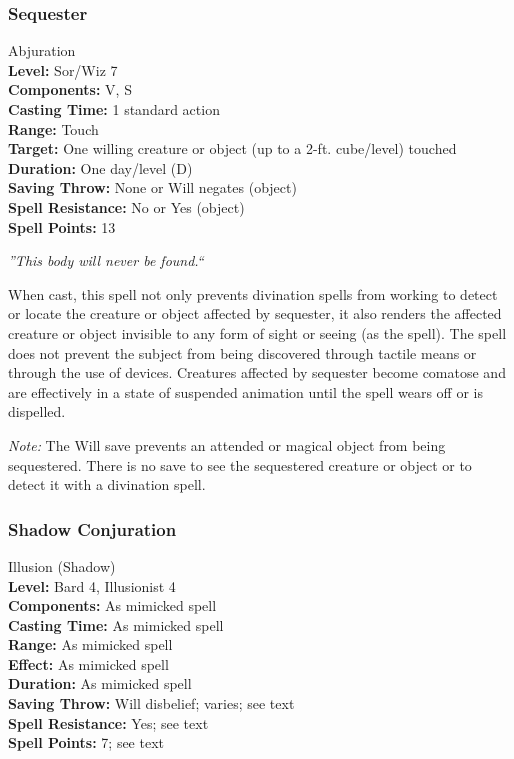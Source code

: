 \subsubsection{Sequester}
\label{Spell:Sequester}
Abjuration
\\ \textbf{Level:} Sor/Wiz 7
\\ \textbf{Components:} V, S
\\ \textbf{Casting Time:} 1 standard action
\\ \textbf{Range:} Touch
\\ \textbf{Target:} One willing creature or object (up to a 2-ft. cube/level) touched
\\ \textbf{Duration:} One day/level (D)
\\ \textbf{Saving Throw:} None or Will negates (object)
\\ \textbf{Spell Resistance:} No or Yes (object)
\\ \textbf{Spell Points:} 13

\emph{''This body will never be found.``}

When cast, this spell not only prevents divination spells from working to detect or locate the creature or object affected by sequester, 
it also renders the affected creature or object invisible to any form of sight or seeing (as the  spell). 
The spell does not prevent the subject from being discovered through tactile means or through the use of devices. 
Creatures affected by sequester become comatose and are effectively in a state of suspended animation until the spell wears off or is dispelled.

\emph{Note:} The Will save prevents an attended or magical object from being sequestered. 
There is no save to see the sequestered creature or object or to detect it with a divination spell. 
\subsubsection{Shadow Conjuration}
\label{Spell:ShadowConjuration}
Illusion (Shadow)
\\ \textbf{Level:} Bard 4, Illusionist 4
\\ \textbf{Components:} As mimicked spell
\\ \textbf{Casting Time:} As mimicked spell
\\ \textbf{Range:} As mimicked spell
\\ \textbf{Effect:} As mimicked spell
\\ \textbf{Duration:} As mimicked spell
\\ \textbf{Saving Throw:} Will disbelief; varies; see text
\\ \textbf{Spell Resistance:} Yes; see text
\\ \textbf{Spell Points:} 7; see text

